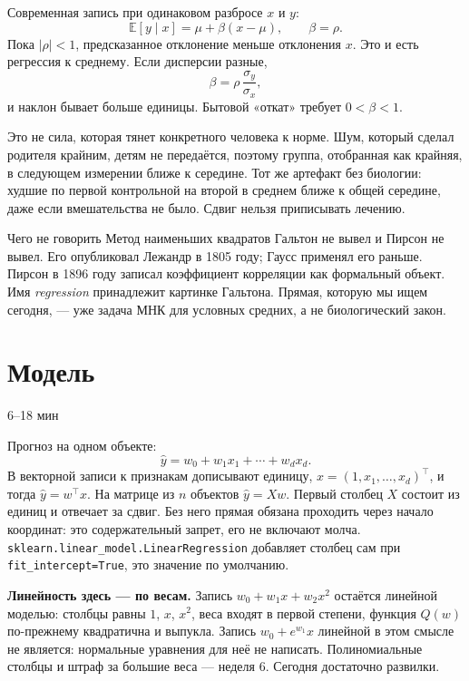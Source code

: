 \documentclass[11pt,a4paper]{article}
\newcommand{\term}[1]{\textbf{\color{navy}#1}}
\newcommand{\timing}[1]{\hfill{\small\color{blue}#1}}
\begin{document}
Современная запись при одинаковом разбросе \(x\) и \(y\):
\[
\mathbb E[y\mid x]=\mu+\beta(x-\mu),\qquad \beta=\rho.
\]
Пока \(|\rho|<1\), предсказанное отклонение меньше отклонения \(x\). Это и есть регрессия к среднему. Если дисперсии разные,
\[
\beta=\rho\,\frac{\sigma_y}{\sigma_x},
\]
и наклон бывает больше единицы. Бытовой «откат» требует \(0<\beta<1\).

Это не сила, которая тянет конкретного человека к норме. Шум, который сделал родителя крайним, детям не передаётся, поэтому группа, отобранная как крайняя, в следующем измерении ближе к середине. Тот же артефакт без биологии: худшие по первой контрольной на второй в среднем ближе к общей середине, даже если вмешательства не было. Сдвиг нельзя приписывать лечению.

\begin{warnbox}{Чего не говорить}
Метод наименьших квадратов Гальтон не вывел и Пирсон не вывел. Его опубликовал Лежандр в 1805 году; Гаусс применял его раньше. Пирсон в 1896 году записал коэффициент корреляции как формальный объект. Имя \emph{regression} принадлежит картинке Гальтона. Прямая, которую мы ищем сегодня, --- уже задача МНК для условных средних, а не биологический закон.
\end{warnbox}

\section{Модель}

\timing{6--18 мин}

Прогноз на одном объекте:
\[
\hat y = w_0 + w_1 x_1 + \cdots + w_d x_d.
\]
В векторной записи к признакам дописывают единицу, \(x=(1,x_1,\ldots,x_d)^{\top}\), и тогда \(\hat y=w^{\top}x\). На матрице из \(n\) объектов \(\hat y=Xw\). Первый столбец \(X\) состоит из единиц и отвечает за сдвиг. Без него прямая обязана проходить через начало координат: это содержательный запрет, его не включают молча. \texttt{sklearn.linear\_model.LinearRegression} добавляет столбец сам при \texttt{fit\_intercept=True}, это значение по умолчанию.

\term{Линейность здесь --- по весам.} Запись \(w_0+w_1 x+w_2 x^{2}\) остаётся линейной моделью: столбцы равны \(1\), \(x\), \(x^{2}\), веса входят в первой степени, функция \(Q(w)\) по-прежнему квадратична и выпукла. Запись \(w_0+e^{w_1}x\) линейной в этом смысле не является: нормальные уравнения для неё не написать. Полиномиальные столбцы и штраф за большие веса --- неделя 6. Сегодня достаточно развилки.
\end{document}

